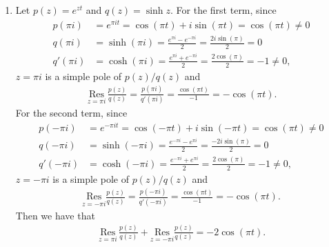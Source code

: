 \documentclass[a4paper,12pt]{article}
\begin{document}
\begin{enumerate}
\begin{enumerate}
            \item
                Let $p(z) = e^{zt}$ and $q(z) = \sinh z$. For the first term, since
                \begin{align*}
                    p(\pi i) &= e^{\pi it} = \cos(\pi t) + i\sin(\pi t) = \cos(\pi t) \neq 0 \\
                    q(\pi i) &= \sinh(\pi i) = \frac{e^{\pi i} - e^{-\pi i}}{2} = \frac{2i \sin(\pi)}{2} = 0 \\
                    q'(\pi i) &= \cosh(\pi i) = \frac{e^{\pi i} + e^{-\pi i}}{2} = \frac{2\cos(\pi)}{2} = -1 \neq 0,
                \end{align*}
                $z = \pi i$ is a simple pole of $p(z) / q(z)$ and
                \begin{align*}
                    \underset{z = \pi i}{\text{\ Res\ }} \frac{p(z)}{q(z)} = \frac{p(\pi i)}{q'(\pi i)} = \frac{\cos(\pi t)}{-1} = -\cos(\pi t).
                \end{align*}
                For the second term, since
                \begin{align*}
                    p(-\pi i) &= e^{-\pi it} = \cos(-\pi t) + i\sin(-\pi t) = \cos(\pi t) \neq 0 \\
                    q(-\pi i) &= \sinh(-\pi i) = \frac{e^{-\pi i} - e^{\pi i}}{2} = \frac{-2i \sin(\pi)}{2} = 0 \\
                    q'(-\pi i) &= \cosh(-\pi i) = \frac{e^{-\pi i} + e^{\pi i}}{2} = \frac{2\cos(\pi)}{2} = -1 \neq 0,
                \end{align*}
                $z = -\pi i$ is a simple pole of $p(z) / q(z)$ and
                \begin{align*}
                    \underset{z = -\pi i}{\text{\ Res\ }} \frac{p(z)}{q(z)} = \frac{p(-\pi i)}{q'(-\pi i)} = \frac{\cos(\pi t)}{-1} = -\cos(\pi t).
                \end{align*}
                Then we have that
                \begin{align*}
                    \underset{z = \pi i}{\text{\ Res\ }} \frac{p(z)}{q(z)} + \underset{z = -\pi i}{\text{\ Res\ }} \frac{p(z)}{q(z)} = -2\cos(\pi t).
                \end{align*}
        \end{enumerate}


\end{enumerate}
\end{document}
